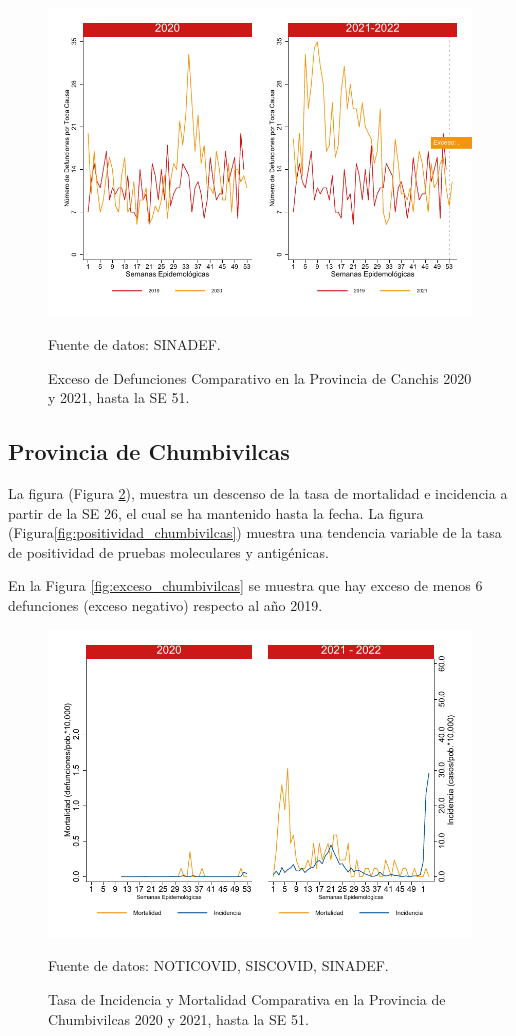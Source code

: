 \documentclass[12pt,a4paper,openany]{book}
\begin{document}
		\begin{figure}[h]
			\caption{Exceso de Defunciones Comparativo en la Provincia de Canchis 2020 y 2021, hasta la SE 51.}\label{fig:exceso_canchis}
			\begin{center}
				\includegraphics[width=0.7\linewidth]{../figuras/exceso_5}
			\end{center}
			{\footnotesize {Fuente de datos: SINADEF.}}
		\end{figure}
		
		\clearpage
		
		\subsection*{Provincia de Chumbivilcas}
		\noindent La figura (Figura \ref{fig:inc_mort_chumbivilcas}),  muestra un descenso de la tasa de mortalidad e incidencia a partir de la SE 26, el cual se ha mantenido hasta la fecha. 
		\noindent La figura (Figura\ref{fig:positividad_chumbivilcas}) muestra una tendencia variable de la tasa de positividad de pruebas moleculares y antigénicas.
		
		En la Figura \ref{fig:exceso_chumbivilcas} se muestra que hay exceso de menos 6 defunciones (exceso negativo) respecto al año 2019.
		
		\begin{figure}[h]
			\caption{Tasa de Incidencia y Mortalidad Comparativa en la Provincia de Chumbivilcas 2020 y 2021, hasta la SE 51.}\label{fig:inc_mort_chumbivilcas}
			\begin{center}
				\includegraphics[width=0.7\linewidth]{../figuras/incidencia_mortalidad_20_21_6}
			\end{center}
			{\footnotesize {Fuente de datos: NOTICOVID, SISCOVID, SINADEF.}}
		\end{figure}
		
\end{document}
